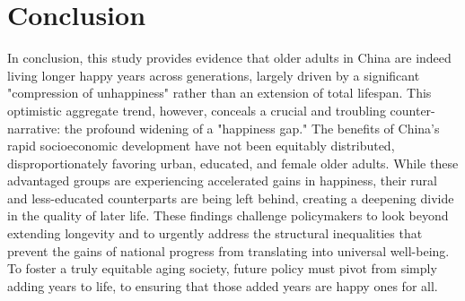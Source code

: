\documentclass[12pt, a4paper]{article}
\begin{document}
\section{Conclusion}

In conclusion, this study provides evidence that older adults in China are indeed living longer happy years across generations, largely driven by a significant "compression of unhappiness" rather than an extension of total lifespan. This optimistic aggregate trend, however, conceals a crucial and troubling counter-narrative: the profound widening of a "happiness gap." The benefits of China's rapid socioeconomic development have not been equitably distributed, disproportionately favoring urban, educated, and female older adults. While these advantaged groups are experiencing accelerated gains in happiness, their rural and less-educated counterparts are being left behind, creating a deepening divide in the quality of later life. These findings challenge policymakers to look beyond extending longevity and to urgently address the structural inequalities that prevent the gains of national progress from translating into universal well-being. To foster a truly equitable aging society, future policy must pivot from simply adding years to life, to ensuring that those added years are happy ones for all.

\newpage
\printbibliography

\renewcommand\theequation{\Alph{section}\arabic{equation}} %
\renewcommand\thefigure{\Alph{section}\arabic{figure}} %
\end{document}
